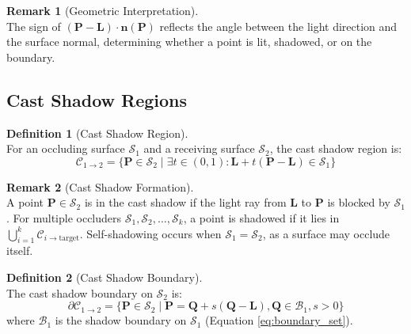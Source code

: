\documentclass[12pt]{article}
\newcommand{\vect}[1]{\bm{#1}}
\theoremstyle{definition}
\newtheorem{definition}{Definition}[subsection]
\newtheorem{remark}{Remark}[subsection]
\begin{document}
\begin{remark}[Geometric Interpretation] ~\\
The sign of $(\vect{P} - \vect{L}) \cdot \vect{n}(\vect{P})$ reflects the angle between the light direction and the surface normal, determining whether a point is lit, shadowed, or on the boundary.
\end{remark}

\subsection{Cast Shadow Regions}

\begin{definition}[Cast Shadow Region] ~\\
For an occluding surface $\mathcal{S}_1$ and a receiving surface $\mathcal{S}_2$, the cast shadow region is:
\begin{equation}
\boxed{\mathcal{C}_{1 \to 2} = \{\vect{P} \in \mathcal{S}_2 \mid \exists t \in (0,1): \vect{L} + t(\vect{P} - \vect{L}) \in \mathcal{S}_1\}} \label{eq:cast_shadow}
\end{equation}
\end{definition}

\begin{remark}[Cast Shadow Formation] ~\\
A point $\vect{P} \in \mathcal{S}_2$ is in the cast shadow if the light ray from $\vect{L}$ to $\vect{P}$ is blocked by $\mathcal{S}_1$. For multiple occluders $\mathcal{S}_1, \mathcal{S}_2, \ldots, \mathcal{S}_k$, a point is shadowed if it lies in $\bigcup_{i=1}^k \mathcal{C}_{i \to \text{target}}$. Self-shadowing occurs when $\mathcal{S}_1 = \mathcal{S}_2$, as a surface may occlude itself.
\end{remark}

\begin{definition}[Cast Shadow Boundary] ~\\
The cast shadow boundary on $\mathcal{S}_2$ is:
\begin{equation}
\boxed{\partial\mathcal{C}_{1 \to 2} = \{\vect{P} \in \mathcal{S}_2 \mid \vect{P} = \vect{Q} + s(\vect{Q} - \vect{L}), \vect{Q} \in \mathcal{B}_1, s > 0\}} \label{eq:cast_boundary}
\end{equation}
where $\mathcal{B}_1$ is the shadow boundary on $\mathcal{S}_1$ (Equation \eqref{eq:boundary_set}).
\end{definition}
\end{document}
